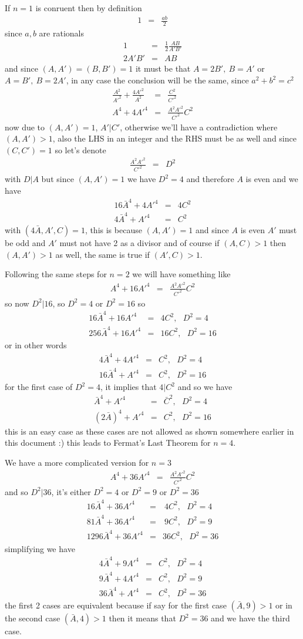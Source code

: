 \documentclass[aps,preprint,preprintnumbers,nofootinbib,showpacs,prd]{revtex4-1}
\newcommand{\nbea}{\begin{eqnarray*}}
\newcommand{\neea}{\end{eqnarray*}}
\begin{document}
If $n=1$ is conruent then by definition
%
\nbea
1 & = & \frac{ab}{2}
\neea
%
since $a,b$ are rationals
%
\nbea
1 & = & \frac{1}{2} \frac{AB}{A'B'} \\
2A'B' & = & AB
\neea
%
and since $(A,A')=(B,B')=1$ it must be that $A = 2B',~B=A'$ or $A=B',~B=2A'$, in any case the conclusion will be the same, since $a^2 + b^2 = c^2$
%
\nbea
\frac{A^2}{{A'}^2} + \frac{4{A'}^2}{A^2} & = & \frac{C^2}{{C'}^2} \\
A^4 + 4{A'}^4 & = & \frac{A^2{A'}^2}{{C'}^2} C^2
\neea
%
now due to $(A,A')=1$, $A'|C'$, otherwise we'll have a contradiction where $(A,A')>1$, also the LHS in an integer and the RHS must be as well and since $(C,C')=1$ so let's denote
%
\nbea
\frac{A^2{A'}^2}{{C'}^2} & = & D^2
\neea
%
with $D|A$ but since $(A,A')=1$ we have $D^2 = 4$ and therefore $A$ is even and we have
%
\nbea
16{\bar A}^4 + 4{A'}^4 & = & 4C^2 \\
4{\bar A}^4 + {A'}^4 & = & C^2
\neea
%
with $(4{\bar A},A',C) = 1$, this is because $(A,A')=1$ and since $A$ is even $A'$ must be odd and $A'$ must not have 2 as a divisor and of course if $(A,C)>1$ then $(A,A')>1$ as well, the same is true if $(A',C)>1$.

Following the same steps for $n=2$ we will have something like
%
\nbea
A^4 + 16{A'}^4 & = & \frac{A^2{A'}^2}{{C'}^2} C^2
\neea
%
so now $D^2|16$, so $D^2=4$ or $D^2=16$ so
%
\nbea
16{\bar A}^4 + 16{A'}^4 & = & 4C^2,~~~D^2 = 4 \\
256{\bar A}^4 + 16{A'}^4 & = & 16C^2,~~~D^2 = 16
\neea
%
or in other words
%
\nbea
4{\bar A}^4 + 4{A'}^4 & = & C^2,~~~D^2 = 4 \\
16{\bar A}^4 + {A'}^4 & = & C^2,~~~D^2 = 16
\neea
%
for the first case of $D^2=4$, it implies that $4|C^2$ and so we have
%
\nbea
{\bar A}^4 + {A'}^4 & = & {\bar C}^2,~~~D^2 = 4 \\
(2{\bar A})^4 + {A'}^4 & = & C^2,~~~D^2 = 16
\neea
%
this is an easy case as these cases are not allowed as shown somewhere earlier in this document :) this leads to Fermat's Last Theorem for $n=4$.

We have a more complicated version for $n=3$
%
\nbea
A^4 + 36{A'}^4 & = & \frac{A^2{A'}^2}{{C'}^2} C^2
\neea
%
and so $D^2|36$, it's either $D^2 = 4$ or $D^2=9$ or $D^2=36$
\nbea
16{\bar A}^4 + 36{A'}^4 & = & ~4C^2,~~~D^2 = 4 \\
81{\bar A}^4 + 36{A'}^4 & = & ~9C^2,~~~D^2 = 9 \\
1296{\bar A}^4 + 36{A'}^4 & = & 36C^2,~~~D^2 = 36
\neea
%
simplifying we have
%
\nbea
4{\bar A}^4 + 9{A'}^4 & = & C^2,~~~D^2 = 4 \\
9{\bar A}^4 + 4{A'}^4 & = & C^2,~~~D^2 = 9 \\
36{\bar A}^4 + {A'}^4 & = & C^2,~~~D^2 = 36
\neea
%
the first 2 cases are equivalent because if say for the first case $(\bar A,9) > 1$ or in the second case $(\bar A,4) > 1$ then it means that $D^2=36$ and we have the third case.
\end{document}
